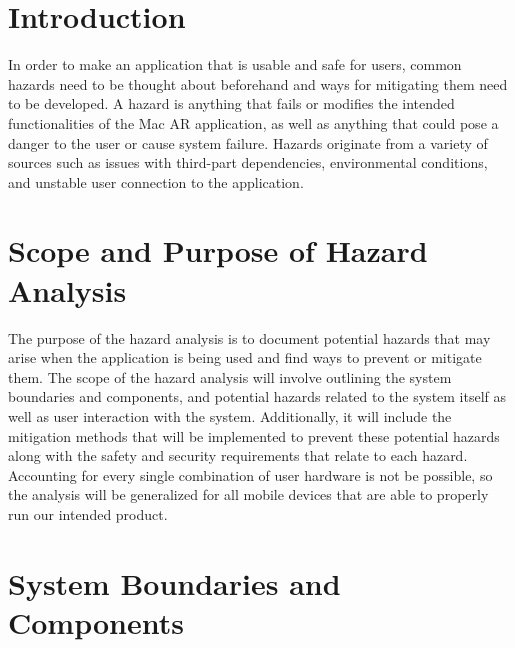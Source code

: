 \documentclass{article}
\begin{document}
\section{Introduction}


In order to make an application that is usable and safe for users, common hazards need to be thought about beforehand and ways for mitigating them need to be developed. A hazard is anything that fails or modifies the intended functionalities of the Mac AR application, as well as anything that could pose a danger to the user or cause system failure. Hazards originate from a variety of sources such as issues with third-part dependencies, environmental conditions, and unstable user connection to the application. 

\section{Scope and Purpose of Hazard Analysis}
The purpose of the hazard analysis is to document potential hazards that may arise when the application is being used and find ways to prevent or mitigate them. The scope of the hazard analysis will involve outlining the system boundaries and components, and potential hazards related to the system itself as well as user interaction with the system. Additionally, it will include the mitigation methods that will be implemented to prevent these potential hazards along with the safety and security requirements that relate to each hazard. Accounting for every single combination of user hardware is not be possible, so the analysis will be generalized for all mobile devices that are able to properly run our intended product.


\section{System Boundaries and Components}
\end{document}
